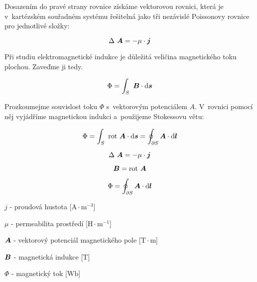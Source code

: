 Dosazením do pravé strany rovnice získáme vektorovou rovnici, která je v~kartézském souřadném systému řešitelná jako tři nezávislé Poissonovy rovnice pro jednotlivé složky:

\begin{equation}
\Delta \ \boldsymbol{A} = -\mu \cdot \boldsymbol{j}
\end{equation}

Při studiu elektromagnetické indukce je důležitá veličina magnetického toku plochou. Zaveďme ji tedy.

\begin{equation}
\Phi = \int_S \ \boldsymbol{B} \cdot \mathrm{d}\boldsymbol{s}
\end{equation}

Prozkoumejme souvislost toku \(\Phi\) s~vektorovým potenciálem \(A\). V~rovnici pomocí něj vyjádříme magnetickou indukci a~použijeme Stokessovu větu:

\begin{equation}
\Phi = \int_S \ \mathrm{rot} \ \boldsymbol{A} \cdot \mathrm{d}\boldsymbol{s} = \oint_{\partial S} \boldsymbol{A} \cdot \mathrm{d}\boldsymbol{l}
\end{equation}

\begin{fact}
\begin{equation}
\Delta \ \boldsymbol{A} = -\mu \cdot \boldsymbol{j}
\end{equation}

\begin{equation}
\boldsymbol{B} = \mathrm{rot} \ \boldsymbol{A}
\end{equation}

\begin{equation}
\Phi = \oint_{\partial S} \boldsymbol{A} \cdot \mathrm{d}\boldsymbol{l}
\end{equation}

\(j\) - proudová hustota [\(\mathrm{A} \cdot \mathrm{m}^{-3}\)]

\(\mu\) - permeabilita prostředí [\(\mathrm{H} \cdot \mathrm{m}^{-1}\)]

\(\boldsymbol{A}\) - vektorový potenciál magnetického pole [\(\mathrm{T} \cdot \mathrm{m}\)]

\(\boldsymbol{B}\) - magnetická indukce [\(\mathrm{T}\)]

\(\Phi\) - magnetický tok [\(\mathrm{Wb}\)]
\end{fact}
